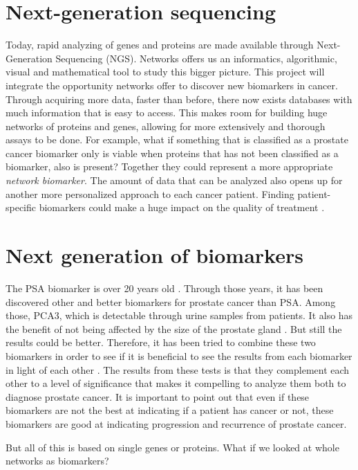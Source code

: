 \documentclass[UKenglish]{ifimaster}
\begin{document}
\chapter{Next-generation sequencing}
Today, rapid analyzing of genes and proteins are made available through
Next-Generation Sequencing (NGS)\cite{ngs1}.
Networks offers us an informatics, algorithmic, visual and mathematical tool to
study this bigger picture. This project will integrate the opportunity networks
offer to discover new biomarkers in cancer.  Through acquiring more data, faster
than before, there now exists databases with much information that is easy to
access. This makes room for building huge networks of proteins and genes,
allowing for more extensively and thorough assays to be done. For example, what
if something that is classified as a prostate cancer biomarker only is viable
when proteins that has not been classified as a biomarker, also is present?
Together they could represent a more appropriate \emph{network biomarker}. The
amount of data that can be analyzed also opens up for another more personalized
approach to each cancer patient. Finding patient-specific biomarkers could make
a huge impact on the quality of treatment \cite{personalized}.
\chapter{Next generation of biomarkers}
The PSA biomarker is over 20 years old \cite{psa-age}. Through those years, it
has been discovered other and better biomarkers for prostate cancer than PSA.
Among those, PCA3, which is detectable through urine samples from patients. It
also has the benefit of not being affected by the size of the prostate gland
\cite{pca3-size}. But still the results could be better. Therefore, it has been
tried to combine these two biomarkers in order to see if it is beneficial to see
the results from each biomarker in light of each other \cite{beyondpsa}. The
results from these tests is that they complement each other to a level of
significance that makes it compelling to analyze them both to diagnose prostate
cancer. It is important to point out that even if these biomarkers are not the
best at indicating if a patient has cancer or not, these biomarkers are good at
indicating progression and recurrence of prostate cancer.

But all of this is based on single genes or proteins. What if we looked at whole
networks as biomarkers?
\end{document}
